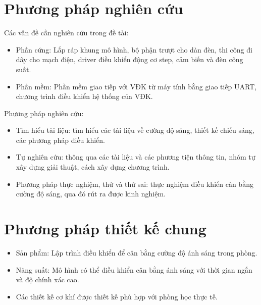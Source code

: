\section{Phương pháp nghiên cứu}
Các vấn đề cần nghiên cứu trong đề tài:
\begin{itemize}
\item Phần cứng: Lắp ráp khung mô hình, bộ phận trượt cho dàn đèn, thi công đi dây cho mạch điện, driver điều khiển động cơ step, cảm biến và đèn công suất.
\item Phần mềm: Phần mềm giao tiếp với VĐK từ máy tính bằng giao tiếp UART, chương trình điều khiển hệ thống của VĐK.
\end{itemize}
Phương pháp nghiên cứu:
\begin{itemize}
\item Tìm hiểu tài liệu: tìm hiểu các tài liệu về cường độ sáng, thiết kế chiếu sáng, các phương pháp điều khiển.
\item Tự nghiên cứu: thông qua các tài liệu và các phương tiện thông tin, nhóm tự xây dựng giải thuật, cách xây dựng chương trình.
\item Phương pháp thực nghiệm, thử và thử sai: thực nghiệm điều khiển cân bằng cường độ sáng, qua đó rút ra được kinh nghiệm.
\end{itemize}

\section{Phương pháp thiết kế chung}
\begin{itemize}
\item Sản phẩm: Lập trình điều khiển để cân bằng cường độ ánh sáng trong phòng.
\item Năng suất: Mô hình có thể điều khiển cân bằng ánh sáng với thời gian ngắn và độ chính xác cao.
\item Các thiết kế cơ khí được thiết kế phù hợp với phòng học thực tế.
\end{itemize}





